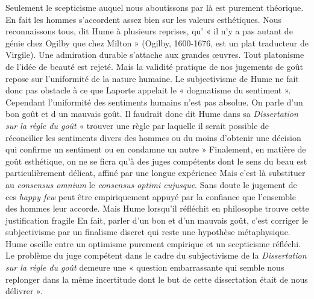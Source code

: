 Seulement le scepticisme auquel nous aboutissons par là
est purement théorique. En fait les hommes s’accordent
assez bien sur les valeurs esthétiques. Nous reconnaissons
tous, dit Hume à plusieurs reprises, qu’ « il n’y a pas
autant de génie chez Ogilby que chez Milton » (Ogilby,
1600-1676, est un plat traducteur de Virgile). Une admiration durable 
s’attache aux grandes œuvres. Tout platonisme de l’idée de beauté est rejeté.
Mais la validité pratique de nos jugements de goût repose sur l’uniformité
de la nature humaine. Le subjectivisme de Hume ne fait
donc pas obstacle à ce que Laporte appelait le « dogmatisme
du sentiment ». Cependant l’uniformité des sentiments
humains n’est pas absolue. On parle d’un bon goût et
d un mauvais goût. Il faudrait donc dit Hume dans sa
{\it Dissertation sur la règle du goût} « trouver une règle par
laquelle il serait possible de réconcilier les sentiments
divers des hommes ou du moins d’obtenir une décision
qui confirme un sentiment ou en condamne un autre »
Finalement, en matière de goût esthétique, on ne se ficra
qu’à des juges compétents dont le sens du beau est particulièrement 
délicat, affiné par une longue expérience
Mais c’est là substituer au {\it consensus omnium} le {\it consensus
optimi cujusque}. Sans doute le jugement de ces {\it happy few}
peut être empiriquement appuyé par la confiance que
l’ensemble des hommes leur accorde. Mais Hume lorsqu’il
réfléchit en philosophe trouve cette justification fragile
En fait, parler d’un bon et d’un mauvais goût, c’est corriger
le subjectivisme par un finalisme discret qui reste une
hypothèse métaphysique. Hume oscille entre un optimisme
purement empirique et un scepticisme réfléchi. Le problème 
du juge compétent dans le cadre du subjectivisme
de la {\it Dissertation sur la règle du goût} demeure une « question
embarrassante qui semble nous replonger dans la même
incertitude dont le but de cette dissertation était de nous
délivrer ».

